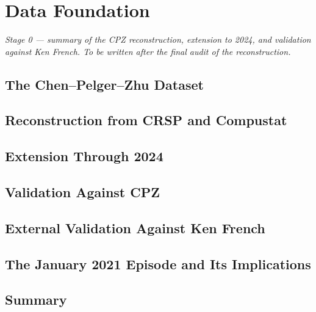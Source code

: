 \chapter{Data Foundation}
\label{ch:data_foundation}

\textit{Stage 0 — summary of the CPZ reconstruction, extension to 2024,
and validation against Ken French. To be written after the final audit of
the reconstruction.}

\section{The Chen--Pelger--Zhu Dataset}
\section{Reconstruction from CRSP and Compustat}
\section{Extension Through 2024}
\section{Validation Against CPZ}
\section{External Validation Against Ken French}
\section{The January 2021 Episode and Its Implications}
\section{Summary}